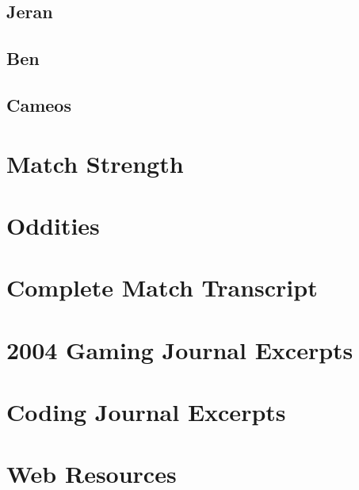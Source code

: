 \documentclass[a4paper,twoside,titlepage]{book}
\begin{document}
      \section{Jeran}
      \section{Ben}
      \section{Cameos}
    \chapter{Match Strength}
    \chapter{Oddities}
  \begin{appendices}
    \chapter{Complete Match Transcript}
    \chapter{2004 Gaming Journal Excerpts}
    \chapter{Coding Journal Excerpts}
    \chapter{Web Resources}
  \end{appendices}
  \clearpage
  \printindex
\end{document}
